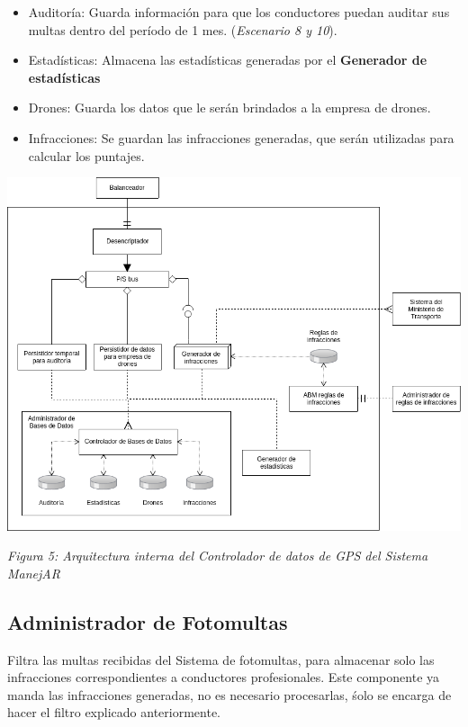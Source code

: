 \begin{itemize}
  \item Auditoría: Guarda información para que los conductores puedan auditar
  sus multas dentro del período de 1 mes. (\textit{Escenario 8 y 10}).
  \item Estadísticas: Almacena las estadísticas generadas por el \textbf{Generador de estadísticas}
  \item Drones: Guarda los datos que le serán brindados a la empresa de drones.
  \item Infracciones: Se guardan las infracciones generadas, que serán utilizadas
  para calcular los puntajes.
\end{itemize}


\begin{center}
  \includegraphics[width=1\textwidth]{./imagenes/arquitectura_tp2/controlador_datos_gps.png}
  \centerline{\textit{Figura 5: Arquitectura interna del Controlador de datos de GPS del Sistema ManejAR}}
\end{center}

\newpage

\subsection{Administrador de Fotomultas}

Filtra las multas recibidas del Sistema de fotomultas, para almacenar solo las 
infracciones correspondientes a conductores profesionales.
Este componente ya manda las infracciones generadas, no es necesario procesarlas,
śolo se encarga de hacer el filtro explicado anteriormente.

